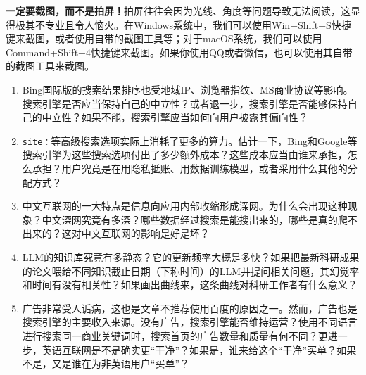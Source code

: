 \textbf{一定要截图，而不是拍屏！}拍屏往往会因为光线、角度等问题导致无法阅读，这显得极其不专业且令人恼火。在Windows系统中，我们可以使用Win+Shift+S快捷键来截图，或者使用自带的截图工具等；对于macOS系统，我们可以使用Command+Shift+4快捷键来截图。如果你使用QQ或者微信，也可以使用其自带的截图工具来截图。

\begin{thinking}
  \begin{enumerate}
    \item Bing国际版的搜索结果排序也受地域IP、浏览器指纹、MS商业协议等影响。搜索引擎是否应当保持自己的中立性？或者退一步，搜索引擎是否能够保持自己的中立性？如果不能，搜索引擎应当如何向用户披露其偏向性？
    \item \texttt{site：}等高级搜索选项实际上消耗了更多的算力。估计一下，Bing和Google等搜索引擎为这些搜索选项付出了多少额外成本？这些成本应当由谁来承担，怎么承担？用户究竟是在用隐私抵账、用数据训练模型，或者采用什么其他的分配方式？
    \item 中文互联网的一大特点是信息向应用内部收缩形成深网。为什么会出现这种现象？中文深网究竟有多深？哪些数据经过搜索是能搜出来的，哪些是真的爬不出来的？这对中文互联网的影响是好是坏？
    \item LLM的知识库究竟有多静态？它的更新频率大概是多快？如果把最新科研成果的论文喂给不同知识截止日期（下称时间）的LLM并提问相关问题，其幻觉率和时间有没有相关性？如果画出曲线来，这条曲线对科研工作者有什么意义？
    \item 广告非常受人诟病，这也是文章不推荐使用百度的原因之一。然而，广告也是搜索引擎的主要收入来源。没有广告，搜索引擎能否维持运营？使用不同语言进行搜索同一商业关键词时，搜索首页的广告数量和质量有何不同？更进一步，英语互联网是不是确实更“干净”？如果是，谁来给这个“干净”买单？如果不是，又是谁在为非英语用户“买单”？
  \end{enumerate}

\end{thinking}